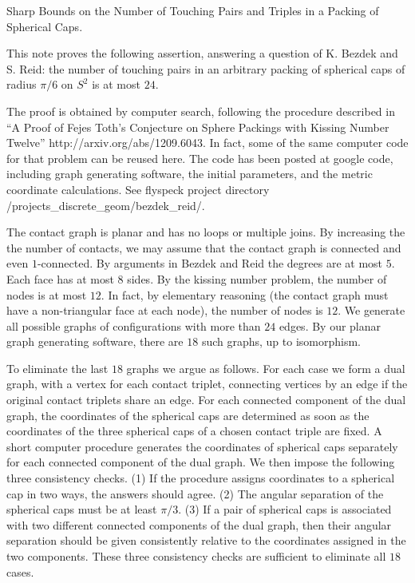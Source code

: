 Sharp Bounds on the Number of Touching Pairs and Triples in a
Packing of Spherical Caps.



This note proves the following assertion, answering a question of
K. Bezdek and S. Reid: the number of touching pairs in an arbitrary
packing of spherical caps of radius $\pi/6$ on $S^2$ is at most $24$.

The proof is obtained by computer search, following the procedure
described in ``A Proof of Fejes Toth's Conjecture on Sphere Packings
with Kissing Number Twelve'' http://arxiv.org/abs/1209.6043.  In fact,
some of the same computer code for that problem can be reused here.
The code has been posted at google code, including graph
generating software, the initial parameters, and the metric coordinate
calculations.  See flyspeck project directory /projects_discrete_geom/bezdek_reid/.

The contact graph is planar and has no loops or multiple joins.  By
increasing the the number of contacts, we may assume that the contact
graph is connected and even $1$-connected.  By arguments in Bezdek and
Reid the degrees are at most $5$.  Each face has at most $8$ sides.
By the kissing number problem, the number of nodes is at most $12$.
In fact, by elementary reasoning (the contact graph must have a
non-triangular face at each node), the number of nodes is $12$.  We
generate all possible graphs of configurations with more than $24$
edges.  By our planar graph generating software, there are $18$ such
graphs, up to isomorphism.

To eliminate the last $18$ graphs we argue as follows. For each case
we form a dual graph, with a vertex for each contact triplet,
connecting vertices by an edge if the original contact triplets share
an edge.  For each connected component of the dual graph, the
coordinates of the spherical caps are determined as soon as the
coordinates of the three spherical caps of a chosen contact triple are
fixed.  A short computer procedure generates the coordinates of
spherical caps separately for each connected component of the dual
graph.  We then impose the following three consistency checks. (1) If
the procedure assigns coordinates to a spherical cap in two ways, the
answers should agree. (2) The angular separation of the spherical caps
must be at least $\pi/3$.  (3) If a pair of spherical caps is
associated with two different connected components of the dual graph,
then their angular separation should be given consistently relative to
the coordinates assigned in the two components.  These three
consistency checks are sufficient to eliminate all $18$ cases.

